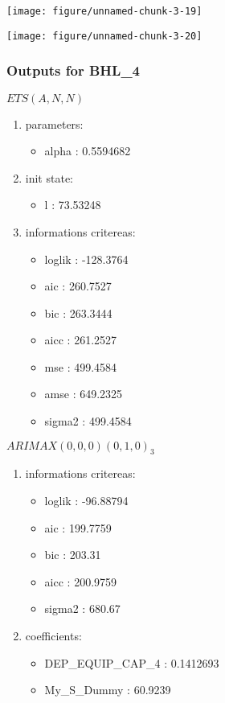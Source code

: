 \documentclass[10pt,a4paper]{article}\usepackage[]{graphicx}\usepackage[]{color}
\makeatletter
\def\maxwidth{ %
  \ifdim\Gin@nat@width>\linewidth
    \linewidth
  \else
    \Gin@nat@width
  \fi
}
\newcommand{\AaA}{\_}
\makeatother
\begin{document}
\texttt{[image: figure/unnamed-chunk-3-19]} 

\newpage

\texttt{[image: figure/unnamed-chunk-3-20]} 

\newpage
\subsubsection{Outputs for BHL\AaA 4}
\begin{multicols}{2}


$ ETS(A,N,N) $
\begin{enumerate}
\item parameters:
\begin{itemize}
\item  alpha :  0.5594682 
\end{itemize}
\item init state:
\begin{itemize}
\item  l :  73.53248 
\end{itemize}
\item informations critereas:
\begin{itemize}
\item  loglik :  -128.3764 
\item  aic :  260.7527 
\item  bic :  263.3444 
\item  aicc :  261.2527 
\item  mse :  499.4584 
\item  amse :  649.2325 
\item  sigma2 :  499.4584 
\end{itemize}
\end{enumerate}

\columnbreak


 $ARIMAX(0,0,0)(0,1,0)_{3}$ 
\begin{enumerate}
\item informations critereas:
\begin{itemize}
\item  loglik :  -96.88794 
\item  aic :  199.7759 
\item  bic :  203.31 
\item  aicc :  200.9759 
\item  sigma2 :  680.67 
\end{itemize}

\item coefficients:
\begin{itemize}
\item  DEP\AaA EQUIP\AaA CAP\AaA 4 :  0.1412693 
\item  My_S_Dummy :  60.9239 
\end{itemize}
\end{enumerate}
\end{multicols}
\end{document}
